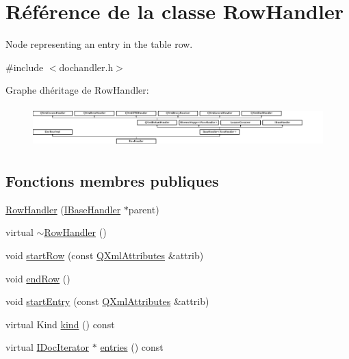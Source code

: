 \hypertarget{class_row_handler}{}\section{Référence de la classe Row\+Handler}
\label{class_row_handler}


Node representing an entry in the table row.  




{\ttfamily \#include $<$dochandler.\+h$>$}

Graphe d\textquotesingle{}héritage de Row\+Handler\+:\begin{figure}[H]
\begin{center}
\leavevmode
\includegraphics[height=1.592040cm]{class_row_handler}
\end{center}
\end{figure}
\subsection*{Fonctions membres publiques}
\begin{DoxyCompactItemize}
\item 
\hyperlink{class_row_handler_a056f065d6449f657e8450f939fd3bdc2}{Row\+Handler} (\hyperlink{class_i_base_handler}{I\+Base\+Handler} $\ast$parent)
\item 
virtual \hyperlink{class_row_handler_a80dd370c534886b0ad8859acdfd7bce8}{$\sim$\+Row\+Handler} ()
\item 
void \hyperlink{class_row_handler_af9aca4eea359ccc5e89a6c3bf8d3e1d5}{start\+Row} (const \hyperlink{class_q_xml_attributes}{Q\+Xml\+Attributes} \&attrib)
\item 
void \hyperlink{class_row_handler_ad9a551daed8cdce1480df0552ae93fb5}{end\+Row} ()
\item 
void \hyperlink{class_row_handler_adf9d15b99e9863d287a936d7dc6cc58b}{start\+Entry} (const \hyperlink{class_q_xml_attributes}{Q\+Xml\+Attributes} \&attrib)
\item 
virtual Kind \hyperlink{class_row_handler_af6902190d95c34cab985a17daab65d3f}{kind} () const 
\item 
virtual \hyperlink{class_i_doc_iterator}{I\+Doc\+Iterator} $\ast$ \hyperlink{class_row_handler_afe348150b290af86251450c3ded20f5a}{entries} () const 
\end{DoxyCompactItemize}
